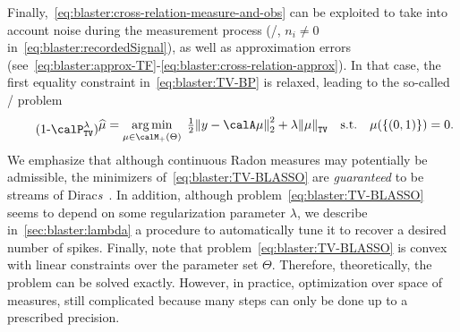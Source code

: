 \mynewline
Finally,~\cref{eq:blaster:cross-relation-measure-and-obs} can be exploited to take into account noise during the measurement process (\ie/,  $n_i\neq0$ in~\cref{eq:blaster:recordedSignal}), as well as approximation errors  (see~\cref{eq:blaster:approx-TF}-\cref{eq:blaster:cross-relation-approx}).
In that case, the first equality constraint in~\eqref{eq:blaster:TV-BP} is relaxed, leading to the so-called \BLASSO/ problem
\begin{equation}
    \stepcounter{equation}
    \tag{\theequation-$\calP^\lambda_\mathtt{TV}$}
    \label{eq:blaster:TV-BLASSO}
    \begin{split}
    \widehat{\mu}
    =
    \kargmin_{\mu \in\posDisRadonMeasure}
    \;
    \tfrac{1}{2} \kvvbar{
        y - \opObs\mu
    }_2^2
    +
    \lambda\normTV{
        \mu
    }
    \quad
    \text{s.t.}
    \quad
    \mu(\{(0, 1)\}) = 0
    .
    \end{split}
\end{equation}
We emphasize that although continuous Radon measures may potentially be admissible, the minimizers of~\cref{eq:blaster:TV-BLASSO} are \emph{guaranteed} to be streams of Dirac\textit{s}~.
In addition, although problem~\cref{eq:blaster:TV-BLASSO} seems to depend on some regularization parameter $\lambda$, we describe in~\cref{sec:blaster:lambda} a procedure to automatically tune it to recover a desired number of spikes.
Finally, note that problem~\cref{eq:blaster:TV-BLASSO} is convex with linear constraints over the parameter set $\Theta$.
Therefore, theoretically, the problem can be solved exactly.
However, in practice, optimization over space of measures, still complicated because many steps can only be done up to a prescribed precision.

